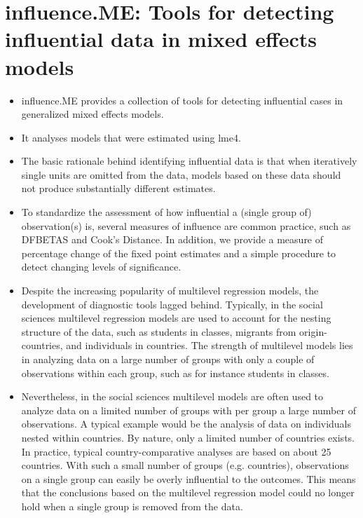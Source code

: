 \documentclass[12pt, a4paper]{report}
\begin{document}
	
\section{influence.ME: Tools for detecting influential data in mixed effects models}
\begin{itemize}
	\item influence.ME provides a collection of tools for detecting influential cases in generalized mixed effects models. 
	\item It analyses models that were estimated using lme4. 
	\item The basic rationale behind identifying influential data is that when iteratively single units are omitted from the data, 
	models based on these data should not produce substantially different estimates. 
	\item To standardize the assessment of how influential a (single group of) observation(s) is, several measures of influence 
	are common practice, such as DFBETAS and Cook's Distance. In addition, we provide a measure of percentage change of the 
	fixed point estimates and a simple procedure to detect changing levels of significance.
	
	
	
	\item Despite the increasing popularity of multilevel regression models, the development of diagnostic tools lagged behind. Typically, in the social sciences multilevel regression models are used to account for the nesting structure of the data, such as students in classes, migrants from origin-countries, and individuals in countries. The strength of multilevel models lies in analyzing data on a large number of groups with only a couple of observations within each group, such as for instance students in classes.
	
	\item Nevertheless, in the social sciences multilevel models are often used to analyze data on a limited number of groups with per group a large number of observations. A typical example would be the analysis of data on individuals nested within countries. By nature, only a limited number of countries exists. In practice, typical country-comparative analyses are based on about 25 countries. With such a small number of groups (e.g. countries), observations on a single group can easily be overly influential to the outcomes. This means that the conclusions based on the multilevel regression model could no longer hold when a single group is removed from the data.
	

\end{itemize}
\end{document}
